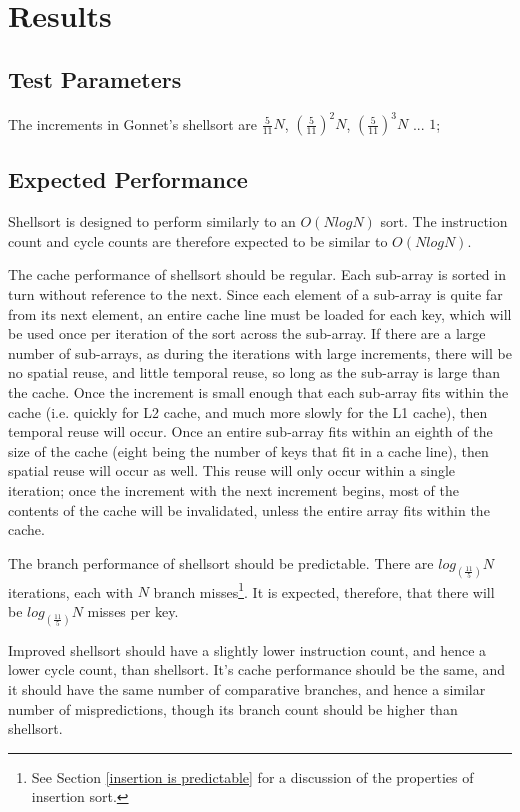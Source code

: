 
\section{Results}
\subsection{Test Parameters}
The increments in Gonnet's shellsort are $\frac{5}{11}N$, $(\frac{5}{11})^2N$,
$(\frac{5}{11})^3N$ ... $1$;

\subsection{Expected Performance}
Shellsort is designed to perform similarly to an $O(NlogN)$ sort. The instruction
count and cycle counts are therefore expected to be similar to $O(NlogN)$.

The cache performance of shellsort should be regular. Each sub-array is sorted in
turn without reference to the next. Since each element of a sub-array is quite
far from its next element, an entire cache line must be loaded for each key,
which will be used once per iteration of the sort across the sub-array. If there
are a large number of sub-arrays, as during the iterations with large increments,
there will be no spatial reuse, and little temporal reuse, so long as the
sub-array is large than the cache. Once the increment is small enough that each
sub-array fits within the cache (i.e. quickly for L2 cache, and much more slowly
for the L1 cache), then temporal reuse will occur. Once an entire sub-array fits
within an eighth of the size of the cache (eight being the number of keys
that fit in a cache line), then spatial reuse will occur as well. This reuse
will only occur within a single iteration; once the increment with the next
increment begins, most of the contents of the cache will be invalidated, unless
the entire array fits within the cache.

The branch performance of shellsort should be predictable. There are
$log_{(\frac{11}{5})}N$ iterations, each with $N$ branch misses\footnote{See Section
\ref{insertion is predictable} for a discussion of the properties of insertion
sort.}. It is expected, therefore, that there will be $log_{(\frac{11}{5})}N$ misses per
key.

Improved shellsort should have a slightly lower instruction count, and hence a
lower cycle count, than shellsort. It's cache performance should be the same,
and it should have the same number of comparative branches, and hence a similar
number of mispredictions, though its branch count should be higher than
shellsort.


